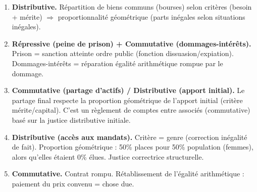 \documentclass[11pt]{article}
\begin{document}
\begin{corrige}[Exercice 1]
\begin{enumerate}
    \item \textbf{Distributive.} Répartition de biens communs (bourses) selon critères (besoin + mérite) $\Rightarrow$ proportionnalité géométrique (parts inégales selon situations inégales).
    \item \textbf{Répressive (peine de prison) + Commutative (dommages-intérêts).} Prison = sanction atteinte ordre public (fonction dissuasion/expiation). Dommages-intérêts = réparation égalité arithmétique rompue par le dommage.
    \item \textbf{Commutative (partage d'actifs) / Distributive (apport initial).} Le partage final respecte la proportion géométrique de l'apport initial (critère mérite/capital). C'est un règlement de comptes entre associés (commutative) basé sur la justice distributive initiale.
    \item \textbf{Distributive (accès aux mandats).} Critère = genre (correction inégalité de fait). Proportion géométrique : 50\% places pour 50\% population (femmes), alors qu'elles étaient 0\% élues. Justice correctrice structurelle.
    \item \textbf{Commutative.} Contrat rompu. Rétablissement de l'égalité arithmétique : paiement du prix convenu = chose due.
\end{enumerate}
\end{corrige}
\end{document}
